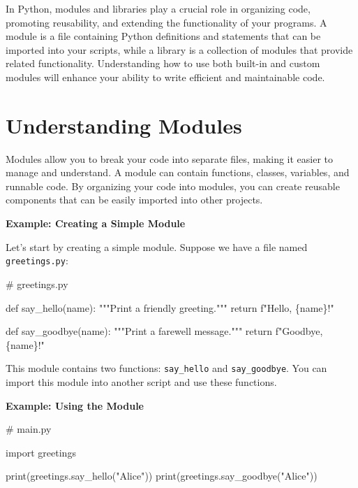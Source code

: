 \documentclass[
  letterpaper,
  DIV=11,
  numbers=noendperiod]{scrreprt}
\newenvironment{Shaded}{\begin{snugshade}}{\end{snugshade}}
\newcommand{\BuiltInTok}[1]{\textcolor[rgb]{0.00,0.23,0.31}{#1}}
\newcommand{\CommentTok}[1]{\textcolor[rgb]{0.37,0.37,0.37}{#1}}
\newcommand{\ControlFlowTok}[1]{\textcolor[rgb]{0.00,0.23,0.31}{#1}}
\newcommand{\ImportTok}[1]{\textcolor[rgb]{0.00,0.46,0.62}{#1}}
\newcommand{\KeywordTok}[1]{\textcolor[rgb]{0.00,0.23,0.31}{#1}}
\newcommand{\NormalTok}[1]{\textcolor[rgb]{0.00,0.23,0.31}{#1}}
\newcommand{\SpecialCharTok}[1]{\textcolor[rgb]{0.37,0.37,0.37}{#1}}
\newcommand{\SpecialStringTok}[1]{\textcolor[rgb]{0.13,0.47,0.30}{#1}}
\newcommand{\StringTok}[1]{\textcolor[rgb]{0.13,0.47,0.30}{#1}}
\begin{document}
In Python, modules and libraries play a crucial role in organizing code,
promoting reusability, and extending the functionality of your programs.
A module is a file containing Python definitions and statements that can
be imported into your scripts, while a library is a collection of
modules that provide related functionality. Understanding how to use
both built-in and custom modules will enhance your ability to write
efficient and maintainable code.

\hypertarget{understanding-modules}{%
\section{Understanding Modules}\label{understanding-modules}}

Modules allow you to break your code into separate files, making it
easier to manage and understand. A module can contain functions,
classes, variables, and runnable code. By organizing your code into
modules, you can create reusable components that can be easily imported
into other projects.

\textbf{Example: Creating a Simple Module}

Let's start by creating a simple module. Suppose we have a file named
\texttt{greetings.py}:

\begin{Shaded}
\begin{Highlighting}[]
\CommentTok{\# greetings.py}

\KeywordTok{def}\NormalTok{ say\_hello(name):}
    \CommentTok{"""Print a friendly greeting."""}
    \ControlFlowTok{return} \SpecialStringTok{f"Hello, }\SpecialCharTok{\{}\NormalTok{name}\SpecialCharTok{\}}\SpecialStringTok{!"}

\KeywordTok{def}\NormalTok{ say\_goodbye(name):}
    \CommentTok{"""Print a farewell message."""}
    \ControlFlowTok{return} \SpecialStringTok{f"Goodbye, }\SpecialCharTok{\{}\NormalTok{name}\SpecialCharTok{\}}\SpecialStringTok{!"}
\end{Highlighting}
\end{Shaded}

This module contains two functions: \texttt{say\_hello} and
\texttt{say\_goodbye}. You can import this module into another script
and use these functions.

\textbf{Example: Using the Module}

\begin{Shaded}
\begin{Highlighting}[]
\CommentTok{\# main.py}

\ImportTok{import}\NormalTok{ greetings}

\BuiltInTok{print}\NormalTok{(greetings.say\_hello(}\StringTok{"Alice"}\NormalTok{))}
\BuiltInTok{print}\NormalTok{(greetings.say\_goodbye(}\StringTok{"Alice"}\NormalTok{))}
\end{Highlighting}
\end{Shaded}
\end{document}
